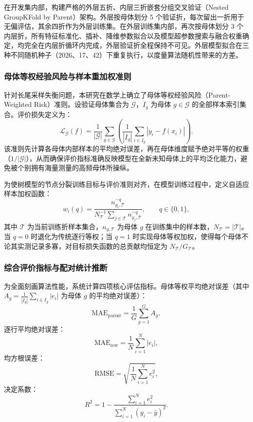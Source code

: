 在开发集内部，构建严格的外层五折、内层三折嵌套分组交叉验证（Nested GroupKFold by Parent）架构。外层按母体划分 5 个验证折，每次留出一折用于无偏评估，其余四折作为外层训练集。在外层训练集内部，再次按母体划分 3 个内层折，所有特征标准化、插补、降维参数拟合以及模型超参数搜索与融合权重确定，均完全在内层折循环内完成\cite{varma2006,cawley2010}，外层验证折全程保持不可见。外层模型拟合在三种不同随机种子（2026、17、42）下重复执行，以度量算法随机性带来的方差。

\subsubsection{母体等权经验风险与样本重加权准则}
针对长尾采样失衡问题，本研究在数学上确立了母体等权经验风险（Parent-Weighted Risk）准则。设验证母体集合为 $\mathcal{G}$，$I_g$ 为母体 $g \in \mathcal{G}$ 的全部样本索引集合。评价损失定义为：
\begin{equation}\label{eq:v2-common-risk}
\mathcal{L}_{\mathcal{G}}(f) = \frac{1}{|\mathcal{G}|} \sum_{g \in \mathcal{G}} \left( \frac{1}{|I_g|} \sum_{i \in I_g} |y_i - f(x_i)| \right).
\end{equation}
该准则先计算各母体内部样本的平均绝对误差，再在母体维度赋予绝对平等的权重（$1/|\mathcal{G}|$），从而确保评价指标准确反映模型在全新未知母体上的平均泛化能力，避免被个别拥有海量测量的高频母体所操纵。

为使树模型的节点分裂训练目标与评价准则对齐，在模型训练过程中，定义自适应样本加权函数：
\begin{equation}
w_i(q) = \frac{n_{g_i, \mathcal{T}}^{-q}}{N_{\mathcal{T}}^{-1} \sum_{j \in \mathcal{T}} n_{g_j, \mathcal{T}}^{-q}}, \qquad q \in \{0, 1\},
\label{eq:v2-train-weight}
\end{equation}
其中 $\mathcal{T}$ 为当前训练折样本集合，$n_{g, \mathcal{T}}$ 为母体 $g$ 在训练集中的样本数，$N_{\mathcal{T}} = |\mathcal{T}|$。当 $q=0$ 时退化为传统逐行等权；当 $q=1$ 时实现母体等权加权，使得每个母体不论其实测记录多寡，对目标损失函数的总贡献均恒定为 $N_{\mathcal{T}}/G_{\mathcal{T}}$。

\subsubsection{综合评价指标与配对统计推断}
为全面刻画算法性能，系统计算四项核心评估指标。母体等权平均绝对误差（其中 $A_g = \frac{1}{|I_g|}\sum_{i\in I_g}|e_i|$ 为母体 $g$ 的平均绝对误差）：
\begin{equation}
\mathrm{MAE}_{\mathrm{parent}} = \frac{1}{G}\sum_{g=1}^G A_g,
\end{equation}
逐行平均绝对误差：
\begin{equation}
\mathrm{MAE}_{\mathrm{row}} = \frac{1}{N}\sum_{i=1}^N |e_i|,
\end{equation}
均方根误差：
\begin{equation}
\mathrm{RMSE} = \sqrt{\frac{1}{N}\sum_{i=1}^N e_i^2},
\end{equation}
决定系数：
\begin{equation}
R^2 = 1 - \frac{\sum_{i=1}^N e_i^2}{\sum_{i=1}^N (y_i - \bar y)^2}.
\end{equation}


